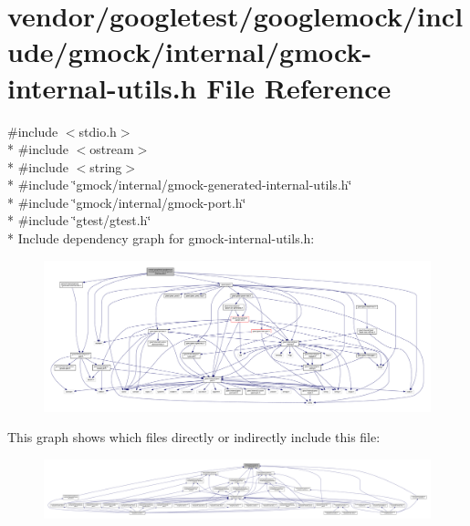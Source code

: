 \hypertarget{gmock-internal-utils_8h}{}\section{vendor/googletest/googlemock/include/gmock/internal/gmock-\/internal-\/utils.h File Reference}
\label{gmock-internal-utils_8h}
{\ttfamily \#include $<$stdio.\+h$>$}\\*
{\ttfamily \#include $<$ostream$>$}\\*
{\ttfamily \#include $<$string$>$}\\*
{\ttfamily \#include \char`\"{}gmock/internal/gmock-\/generated-\/internal-\/utils.\+h\char`\"{}}\\*
{\ttfamily \#include \char`\"{}gmock/internal/gmock-\/port.\+h\char`\"{}}\\*
{\ttfamily \#include \char`\"{}gtest/gtest.\+h\char`\"{}}\\*
Include dependency graph for gmock-\/internal-\/utils.h\+:\nopagebreak
\begin{figure}[H]
\begin{center}
\leavevmode
\includegraphics[width=350pt]{gmock-internal-utils_8h__incl}
\end{center}
\end{figure}
This graph shows which files directly or indirectly include this file\+:\nopagebreak
\begin{figure}[H]
\begin{center}
\leavevmode
\includegraphics[width=350pt]{gmock-internal-utils_8h__dep__incl}
\end{center}
\end{figure}
